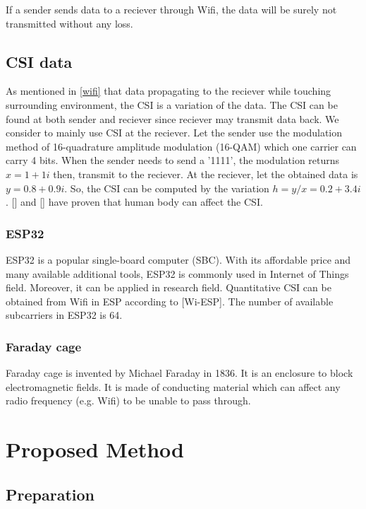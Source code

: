 \documentclass[conference]{IEEEtran}
\begin{document}
	If a sender sends data to a reciever through Wifi, the data will be surely not transmitted without any loss.
	


	\subsection{CSI data}\label{CSI}
	As mentioned in \ref{wifi} that data propagating to the reciever while touching surrounding environment, the CSI is a variation of the data. The CSI can  be found at both sender and reciever since reciever may transmit data back. We consider to mainly use CSI at the reciever. Let the sender use the modulation method of 16-quadrature amplitude modulation (16-QAM) which one carrier can carry 4 bits. When the sender needs to send a '1111', the modulation returns $x=1+1i$ then, transmit to the reciever. At the reciever, let the obtained data is $y=0.8+0.9i$. So, the CSI can be computed by the variation $h=y/x=0.2+3.4i$. [] and [] have proven that human body can affect the CSI.
	
	\subsubsection{ESP32}\label{ESP32}
	ESP32 is a popular single-board computer (SBC). With its affordable price and many available additional tools, ESP32 is commonly used in Internet of Things field. Moreover, it can be applied in research field. Quantitative CSI can be obtained from Wifi in ESP according to [Wi-ESP]. The number of available subcarriers in ESP32 is 64.
	
	\subsubsection{Faraday cage}
	Faraday cage is invented by Michael Faraday in 1836. It is an enclosure to block electromagnetic fields. It is made of conducting material which can affect any radio frequency (e.g. Wifi) to be unable to pass through.
	
	\section{Proposed Method}
	
	\subsection{Preparation}\label{AA}
	
\end{document}

